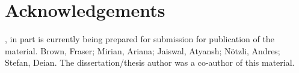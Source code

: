 %


%
%


\section{Acknowledgements}
\label{sec:acknowledgement-spam}
, in part is currently being prepared for submission for
publication of the material. Brown, Fraser; Mirian, Ariana; Jaiswal, Atyansh;
N\"otzli, Andres; Stefan, Deian. The dissertation/thesis author was a
co-author of this material.
